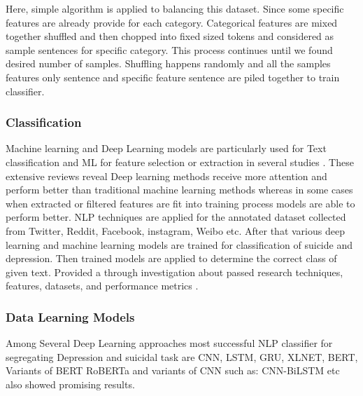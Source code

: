 \documentclass[sn-mathphys,Numbered]{sn-jnl}%
\theoremstyle{thmstyleone}%
\theoremstyle{thmstyletwo}%
\theoremstyle{thmstylethree}%
\begin{document}
Here, simple algorithm is applied to balancing this dataset. Since some specific features are already provide for each category. Categorical features are mixed together shuffled and then chopped into fixed sized tokens and considered as sample sentences for specific category. This process continues until we found desired number of samples. Shuffling happens randomly and all the samples features only sentence and specific feature sentence are piled together to train classifier. 

\subsubsection{Classification}
Machine learning and Deep Learning models are particularly used for Text classification and ML for feature selection or extraction in several studies \cite{castillo2020suicide, chancellor2020methods, zhang2022natural}. These extensive reviews reveal Deep learning methods receive more attention and perform better than traditional machine learning methods whereas in some cases when extracted or filtered features are fit into training process models are able to perform better. NLP techniques are applied for the annotated dataset collected from Twitter, Reddit, Facebook, instagram, Weibo \cite{wang2020depression} etc. After that various deep learning and machine learning models are trained for classification of suicide and depression. Then trained models are applied to determine the correct class of given text. \cite{malhotra2022deep} Provided a through investigation about passed research techniques, features, datasets, and performance metrics \cite{zhang2022natural, chancellor2020methods}. 

\subsubsection{Data Learning Models}
Among Several Deep Learning approaches most successful NLP classifier for segregating Depression and suicidal task are CNN, LSTM, GRU, XLNET, BERT, Variants of BERT RoBERTa and variants of CNN such as: CNN-BiLSTM etc \cite{aldhyani2022detecting, wang2020depression, shetty2020predicting} also showed promising results. 
\end{document}
